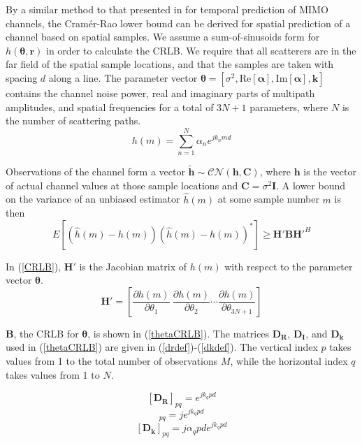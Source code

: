 \documentclass[conference]{ieeetran}
\begin{document}
By a similar method to that presented in \cite{svantesson2003} for temporal prediction of MIMO channels, the Cram\'er-Rao lower bound can be derived for spatial prediction of a channel based on spatial samples.  We assume a sum-of-sinusoids form for $h(\boldsymbol{\theta},\mathbf{r})$ in order to calculate the CRLB. We require that all scatterers are in the far field of the spatial sample locations, and that the samples are taken with spacing $d$ along a line.  The parameter vector $\boldsymbol{\theta}= [\sigma^2, \mathrm{Re}[\boldsymbol{\alpha}], \mathrm{Im}[\boldsymbol{\alpha}], \mathbf{k}]$ contains the channel noise power, real and imaginary parts of multipath amplitudes, and spatial frequencies for a total of $3N+1$ parameters, where $N$ is the number of scattering paths. 
\begin{equation}
h(m) = \sum_{n=1}^N \alpha_n e^{j k_n m d}
\end{equation}

Observations of the channel form a vector $\mathbf{\tilde{h}} \sim \mathcal{CN}(\mathbf{h}, \mathbf{C})$, where $\mathbf{h}$ is the vector of actual channel values at those sample locations and $\mathbf{C}=\sigma^2\mathbf{I}$. A lower bound on the variance of an unbiased estimator $\hat{h}(m)$ at some sample number $m$ is then
\begin{equation} \label{CRLB}
E\left[\left(\hat{h}(m)-h(m)\right)\left(\hat{h}(m)-h(m)\right)^*\right]\geq \mathbf{H'BH'}^H
\end{equation}

In   (\ref{CRLB}), $\mathbf{H'}$ is the Jacobian matrix of $h(m)$ with respect to the parameter vector $\boldsymbol{\theta}$.
\begin{equation}
\mathbf{H'} = \left[ \frac{\partial h(m)}{\partial\theta_1} \ \frac{\partial h(m)}{\partial\theta_2} \cdots \frac{\partial h(m)}{\partial\theta_{3N+1}} \right]
\end{equation}

$\mathbf{B}$, the CRLB for $\boldsymbol{\theta}$, is shown in (\ref{thetaCRLB}). The matrices $\mathbf{D_R}$, $\mathbf{D_I}$, and $\mathbf{D_k}$ used in (\ref{thetaCRLB}) are given in (\ref{drdef})-(\ref{dkdef}).  The vertical index $p$ takes values from 1 to the total number of observations $M$, while the horizontal index $q$ takes values from 1 to $N$.
\addtocounter{equation}{1}
\begin{equation}\label{drdef}
[\mathbf{D_R}]_{pq} = e^{jk_q p d}
\end{equation}
\begin{equation}
[\mathbf{D_I}]_{pq} = je^{jk_q p d}
\end{equation}
\begin{equation}\label{dkdef}
[\mathbf{D_k}]_{pq} = j\alpha_q p d e^{jk_q p d}
\end{equation}
\end{document}

